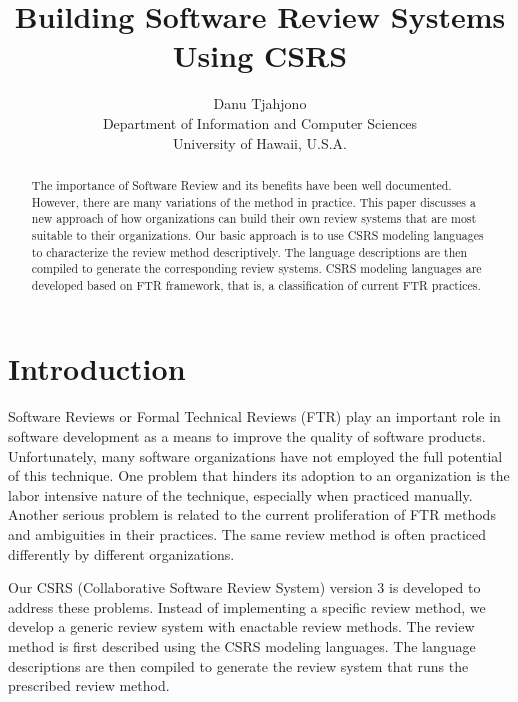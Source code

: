


\title {Building Software Review Systems\\
 Using CSRS}
\author{ Danu Tjahjono\\
Department of Information and Computer Sciences \\
University of Hawaii, U.S.A.}

\maketitle

\thispagestyle{empty}
\begin{abstract}
The importance of Software Review and its benefits have been well
documented. However, there are many variations of the method in
practice. This paper discusses a new approach of how organizations can
build their own review systems that are most suitable to their
organizations. Our basic approach is to use CSRS modeling languages
to characterize the review method descriptively. 
The language descriptions are then compiled to generate the
corresponding review systems.
CSRS modeling languages are developed based on FTR framework, that is,
a classification of current FTR practices.
\end{abstract}

\section{Introduction}

Software Reviews or Formal Technical Reviews (FTR) play
an important role in software development as a means to
improve the quality of software products. Unfortunately, many
software organizations have not employed the full potential of
this technique.  One problem that hinders its adoption to an
organization is the labor intensive nature of the technique,
especially when practiced manually. Another serious problem is related
to  the current proliferation of FTR methods and ambiguities in their 
practices. The same review method is often practiced differently by
different organizations. 

Our CSRS (Collaborative Software Review System) version 3 is developed
to address these problems. Instead of implementing a specific review
method, we develop a generic review system with enactable review
methods. The review method is first described using the CSRS modeling 
languages. The language descriptions are then compiled to generate the
review system that runs the prescribed review method. 

